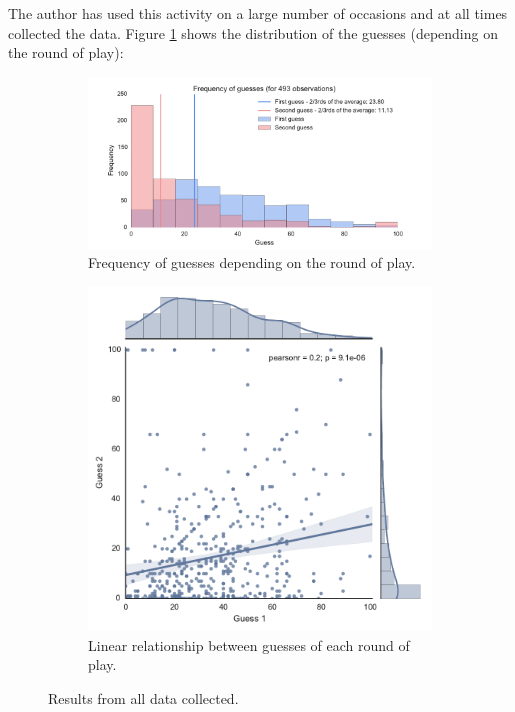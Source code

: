 \documentclass{article}
\begin{document}
The author has used this activity on a large number of occasions and at all
times collected the data. Figure \ref{fig:histogram_of_guess} shows the
distribution of the guesses (depending on the round of play):

\begin{figure}[!hbtp]
    \begin{subfigure}{.6\textwidth}
        \centering
        \includegraphics[width=\textwidth]{../data/histogram_of_guesses.pdf}
        \caption{Frequency of guesses depending on the round of play.}
        \label{fig:histogram_of_guess}
    \end{subfigure}
    \begin{subfigure}{.4\textwidth}
        \centering
        \includegraphics[width=\textwidth]{../data/jointplot_of_guesses.pdf}
        \caption{Linear relationship between guesses of each round of play.}
        \label{fig:jointplot_of_guess}
    \end{subfigure}
    \caption{Results from all data collected.}
    \label{fig:all_results}
\end{figure}
\end{document}

